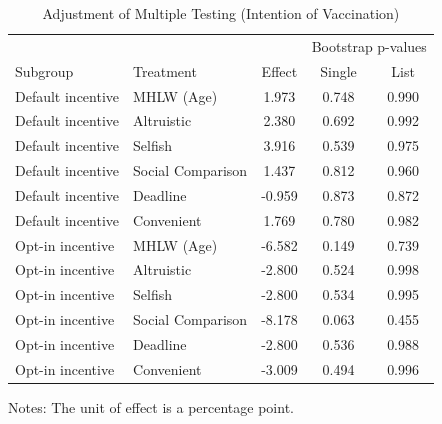\documentclass[
    a4paper
]{article}
\begin{document}
\begin{table}

\caption{\label{tab:multiple-adjust-vacc-int}Adjustment of Multiple Testing (Intention of Vaccination)}
\centering
\fontsize{9}{11}\selectfont
\begin{threeparttable}
\begin{tabular}[t]{llccc}
\toprule
\multicolumn{3}{c}{ } & \multicolumn{2}{c}{Bootstrap p-values} \\
\cmidrule(l{3pt}r{3pt}){4-5}
Subgroup & Treatment & Effect & Single & List\\
\midrule
Default incentive & MHLW (Age) & 1.973 & 0.748 & 0.990\\
Default incentive & Altruistic & 2.380 & 0.692 & 0.992\\
Default incentive & Selfish & 3.916 & 0.539 & 0.975\\
Default incentive & Social Comparison & 1.437 & 0.812 & 0.960\\
Default incentive & Deadline & -0.959 & 0.873 & 0.872\\
Default incentive & Convenient & 1.769 & 0.780 & 0.982\\
Opt-in incentive & MHLW (Age) & -6.582 & 0.149 & 0.739\\
Opt-in incentive & Altruistic & -2.800 & 0.524 & 0.998\\
Opt-in incentive & Selfish & -2.800 & 0.534 & 0.995\\
Opt-in incentive & Social Comparison & -8.178 & 0.063 & 0.455\\
Opt-in incentive & Deadline & -2.800 & 0.536 & 0.988\\
Opt-in incentive & Convenient & -3.009 & 0.494 & 0.996\\
\bottomrule
\end{tabular}
\begin{tablenotes}
\item Notes: The unit of effect is a percentage point.
\end{tablenotes}
\end{threeparttable}
\end{table}
\end{document}
